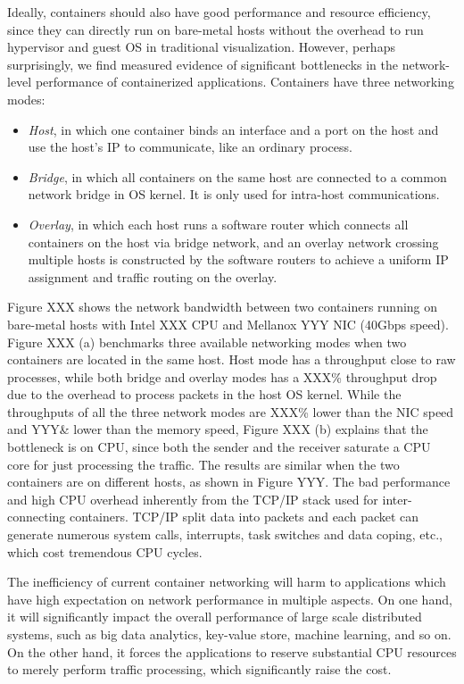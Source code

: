 Ideally, containers should also have good performance and resource efficiency,
since they can directly run on bare-metal hosts without the overhead to run
hypervisor and guest OS in traditional visualization. However, perhaps 
surprisingly, we find measured evidence of significant bottlenecks in the 
network-level performance of containerized applications. Containers have
three networking modes:
\begin{itemize}
	\item {\em Host}, in which one container binds an interface
and a port on the host and use the host's IP to communicate, like an ordinary
process.
	\item {\em Bridge}, in which all containers on the same host are connected to a common network bridge in OS kernel. It is only used for
	intra-host communications.  
	\item {\em Overlay}, in which each host runs a software router which
	connects all containers on the host via bridge network, and an overlay 
	network crossing multiple hosts is constructed by the software routers
	to achieve a uniform IP assignment and traffic routing on the overlay.
\end{itemize}
Figure XXX shows
the network bandwidth between two containers running on bare-metal hosts with 
Intel XXX CPU and Mellanox YYY NIC (40Gbps speed). Figure XXX (a) benchmarks
three available networking modes when two containers are located in the same 
host. Host mode has a throughput close to raw processes, while both bridge
and overlay modes has a XXX\% throughput drop due to the overhead to 
process packets in the host OS kernel. While the throughputs of all the three
network modes are XXX\% lower than the NIC speed and YYY\& lower than the memory
speed, Figure XXX (b) explains that the bottleneck is on CPU, since both
the sender and the receiver saturate a CPU core for just processing the traffic.
The results are similar when the two containers are on different hosts, as shown
in Figure YYY. The bad performance and high CPU overhead inherently from 
the TCP/IP stack used for inter-connecting containers. TCP/IP split data into 
packets and each packet can generate numerous system calls, interrupts, task 
switches and data coping, etc., which cost tremendous CPU cycles.

The inefficiency of current container networking will harm to applications which
have high expectation on network performance in multiple aspects. On one hand,
it will significantly impact the overall performance of large scale distributed systems, such as big data analytics, key-value store, machine learning, and so on.
On the other hand, it forces the applications to reserve substantial CPU
resources to merely perform traffic processing, which significantly raise the 
cost.

